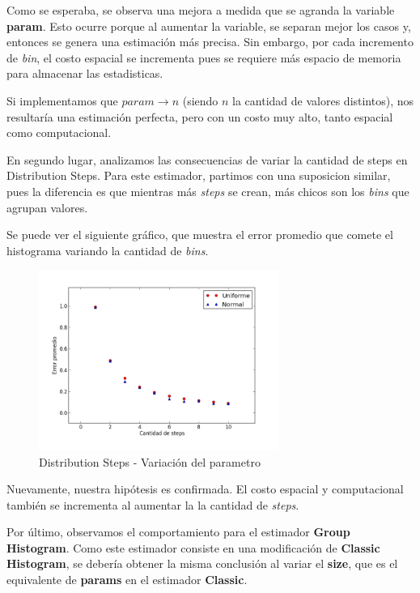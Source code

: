\documentclass[10pt, a4paper,english,spanish,hidelinks]{article}
\begin{document}
{{\newpage

Como se esperaba, se observa una mejora a medida que se agranda la variable \textbf{param}.
Esto ocurre porque al aumentar la variable, se separan mejor los casos y, entonces se genera una estimación más precisa.
Sin embargo, por cada incremento de \textit{bin}, el costo espacial se incrementa pues se requiere
más espacio de memoria para almacenar las estadisticas.

Si implementamos que $param \rightarrow n$ (siendo $n$ la cantidad de valores distintos), nos
resultaría una estimación perfecta, pero con un costo muy alto, tanto espacial como computacional.

En segundo lugar, analizamos las consecuencias de variar la cantidad de steps en Distribution Steps. Para este estimador, partimos con una suposicion similar, pues la diferencia es que mientras
más \textit{steps} se crean, más chicos son los \textit{bins} que agrupan valores.


Se puede ver el siguiente gráfico, que muestra el error promedio que comete el histograma variando
la cantidad de \textit{bins}.

\newpage
\begin{figure}
  \centering
  \includegraphics[width=0.7\textwidth]{./imagenes/ejb2_step_parameter_variation.png}
  \caption{Distribution Steps - Variación del parametro}
\end{figure}

Nuevamente, nuestra hipótesis es confirmada. El costo espacial y computacional también se incrementa al aumentar la 
la cantidad de \textit{steps}.

Por último, observamos el comportamiento para el estimador \textbf{Group Histogram}. 
Como este estimador consiste en una modificación de \textbf{Classic Histogram}, se debería obtener la misma
conclusión al variar el \textbf{size}, que es el equivalente de \textbf{params} en el estimador \textbf{Classic}.

}}
\end{document}
